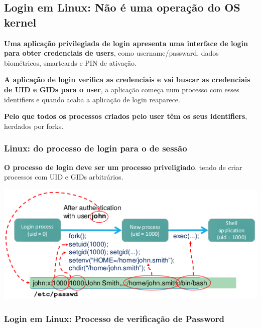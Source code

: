 \documentclass{article}
\begin{document}
\subsection{Login em Linux: Não é uma operação do OS kernel}

\begin{flushleft}
  \textbf{Uma aplicação privilegiada de login apresenta uma interface de login
  para obter credenciais de users}, como username/passward,
  dados biométricos, smartcards e PIN de ativação.

  \vspace{2mm}

  \textbf{A aplicação de login verifica as credenciais e vai buscar
  as credenciais de UID e GIDs para o user}, a aplicação começa
  num processo com esses identifiers e quando acaba a aplicação
  de login reaparece.

  \vspace{2mm}

  \textbf{Pelo que todos os processos criados pelo user têm os seus identifiers},
  herdados por forks.
\end{flushleft}

\pagebreak

\subsubsection{Linux: do processo de login para o de sessão}

\begin{flushleft}
  \textbf{O processo de login deve ser um processo priveligiado}, tendo de
  criar processos com UID e GIDs arbitrários.

  \begin{center}
    \includegraphics[scale=0.4]{39}
  \end{center}
\end{flushleft}

\subsubsection{Login em Linux: Processo de verificação de Password}
\end{document}
